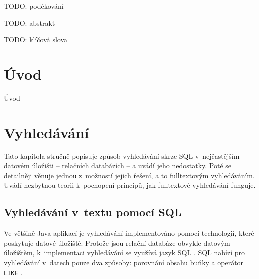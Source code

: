 \documentclass[11pt,oneside]{fithesis2}
\begin{document}
\FrontMatter
\ThesisTitlePage

\begin{ThesisDeclaration}
  \DeclarationText
  \AdvisorName
\end{ThesisDeclaration}

\begin{ThesisThanks}
TODO: poděkování
\end{ThesisThanks}

\begin{ThesisAbstract}
TODO: abstrakt
\end{ThesisAbstract}

\begin{ThesisKeyWords}
TODO: klíčová slova
\end{ThesisKeyWords}

\MainMatter

\tableofcontents



\chapter{Úvod}
Úvod

\chapter{Vyhledávání}
Tato kapitola stručně popisuje způsob vyhledávání skrze SQL v~nejčastějším datovém úložišti -- relačních databázích -- a uvádí jeho nedostatky. Poté se detailněji věnuje jednou z~možností jejich řešení, a to fulltextovým vyhledáváním. Uvádí nezbytnou 
teorii k~pochopení principů, jak fulltextové vyhledávání funguje.

\section{Vyhledávání v~textu pomocí SQL}
\label{SQLsection}
Ve většině Java aplikací je vyhledávání implementováno pomocí technologií, které poskytuje datové úložiště. Protože jsou relační databáze obvykle datovým úložištěm, k~implementaci vyhledávání se využívá jazyk SQL \cite{HibernateSearchAction}. SQL nabízí pro vyhledávání v~datech pouze dva způsoby: porovnání obsahu buňky a operátor \texttt{LIKE} \cite{MistrovstviMySQL}.
\end{document}
